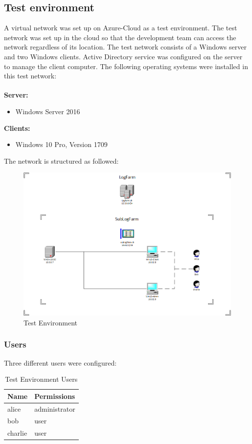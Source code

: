 \subsection{Test environment}
A virtual network was set up on Azure-Cloud as a test environment. The test network was set up in the cloud so that the development team can access the network regardless of its location. The test network consists of a Windows server and two Windows clients. Active Directory service was configured on the server to manage the client computer. The following operating systems were installed in this test network: \\
\\
\textbf{Server:}
\begin{itemize}
    \item Windows Server 2016
\end{itemize}
\textbf{Clients:}
\begin{itemize}
    \item Windows 10 Pro, Version 1709
\end{itemize}
The network is structured as followed:\\
\begin{figure}[H]
    \centering
    \includegraphics[width=0.9\linewidth]{assets/testnetwork.png}
    \caption{Test Environment}
\end{figure}
\subsubsection{Users}
Three different users were configured:
\begin{table}[H]
    \centering
    \begin{tabular}{p{4cm} p{8cm}} \hline
        \textbf{Name} & \textbf{Permissions}  \\ \hline
        alice & administrator  \\ \hline
        bob & user  \\ \hline
        charlie & user  \\ \hline
    \end{tabular}
    \caption{Test Environment Users}
\end{table}
